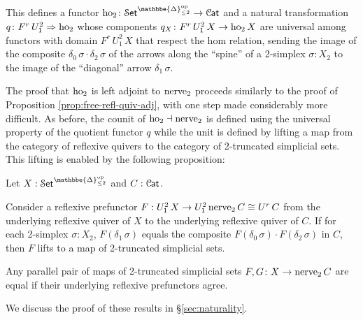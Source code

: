 \documentclass[a4paper,UKenglish,cleveref, autoref, thm-restate]{lipics-v2021}
\newcommand{\op}{\textup{op}}
\newcommand{\ho}{\textup{ho}}
\newcommand{\nerve}{\textup{nerve}}
\newcommand{\cat}[1]{\textup{\textsf{#1}}}%
\newcommand{\1}{\mathbbe{1}}
\newcommand{\2}{\mathbbe{2}}
\newcommand{\3}{\mathbbe{3}}
\newcommand{\DDelta}{\mathbbe{\Delta}}
\newcommand{\Cat}{\mathcal{C}{\kern-.75pt}\cat{at}}
\newcommand{\Set}{\mathcal{S}\cat{et}}
\newcommand{\cdocTwo}[3][]{\href{https://leanprover-community.github.io/mathlib4_docs/find/?pattern=CategoryTheory.#1#2\%E2\%82\%82#3\#doc}{\texttt{#2${}_2$#3}}}
\begin{document}
This defines a functor $\ho_2 \colon \Set^{\DDelta_{\leq 2}^\op} \to \Cat$ and a natural transformation $q \colon F^r\, U^2_1 \Rightarrow \ho_2$ whose components $q_X \colon F^r\, U^2_1\, X \to \ho_2\,X$ are universal among functors with domain $F^r\, U^2_1\, X$ that respect the hom relation, sending the image of the composite $\delta_0\, \sigma \cdot \delta_2\, \sigma$ of the arrows along the ``spine'' of a 2-simplex $\sigma : X_2$ to the image of the ``diagonal'' arrow $\delta_1\, \sigma$.


The proof that $\ho_2$ is left adjoint to $\nerve_2$ proceeds similarly to the proof of Proposition \ref{prop:free-refl-quiv-adj}, with one step made considerably more difficult. As before, the counit of $\ho_2 \dashv \nerve_2$ is defined using the universal property of the quotient functor $q$ while the unit is defined by lifting a map from the category of reflexive quivers to the category of 2-truncated simplicial sets. This lifting is enabled by the following proposition:

\begin{proposition}[\cdocTwo{toNerve}{.mk}, \cdocTwo{toNerve}{.ext}]\label{prop:to-nerve2-mk}
Let $X : \Set^{\DDelta_{\leq 2}^\op}$ and $C : \Cat$.

\begin{romanenumerate}
\item Consider a reflexive prefunctor $F : U^2_1\, X \to U^2_1\, \nerve_2\, C \cong U^r\, C$ from the underlying reflexive quiver of $X$ to the underlying reflexive quiver of $C$. If for each 2-simplex $\sigma : X_2$, $F(\delta_1\, \sigma)$ equals the composite $F(\delta_0\, \sigma) \cdot F(\delta_2\, \sigma)$ in $C$, then $F$ lifts to a map of 2-truncated simplicial sets.
\item Any parallel pair of maps  of 2-truncated simplicial sets $F,G \colon X \to \nerve_2\, C$ are equal if their underlying reflexive prefunctors agree.
\end{romanenumerate}
\end{proposition}

We discuss the proof of these results in \S\ref{sec:naturality}.
\end{document}
